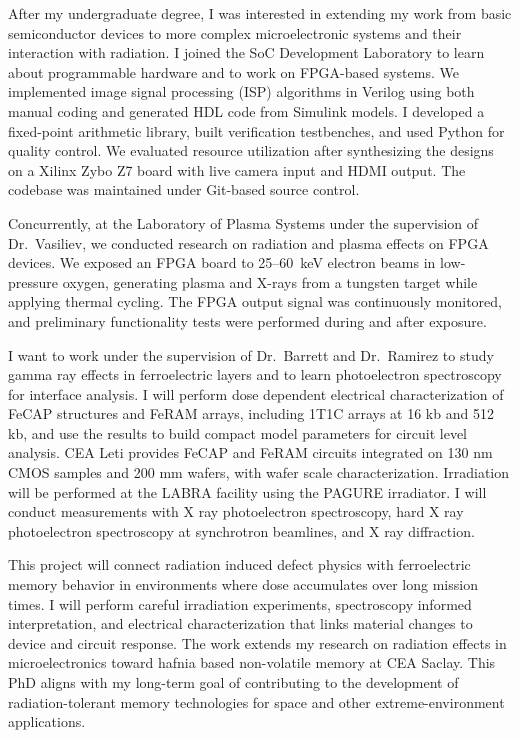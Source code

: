 \documentclass[a4paper,12pt]{article}
\begin{document}
After my undergraduate degree, I was interested in extending my work from basic semiconductor devices to more complex microelectronic systems and their interaction with radiation. I joined the SoC Development Laboratory to learn about programmable hardware and to work on FPGA-based systems. We implemented image signal processing (ISP) algorithms in Verilog using both manual coding and generated HDL code from Simulink models. I developed a fixed-point arithmetic library, built verification testbenches, and used Python for quality control. We evaluated resource utilization after synthesizing the designs on a Xilinx Zybo Z7 board with live camera input and HDMI output. The codebase was maintained under Git-based source control. 

Concurrently, at the Laboratory of Plasma Systems under the supervision of Dr.\ Vasiliev, we conducted research on radiation and plasma effects on FPGA devices. We exposed an FPGA board to 25--60~keV electron beams in low-pressure oxygen, generating plasma and X-rays from a tungsten target while applying thermal cycling. The FPGA output signal was continuously monitored, and preliminary functionality tests were performed during and after exposure.

I want to work under the supervision of Dr.\ Barrett and Dr.\ Ramirez to study gamma ray effects in  ferroelectric layers and to learn photoelectron spectroscopy for interface analysis. I will perform dose dependent electrical characterization of FeCAP structures and FeRAM arrays, including 1T1C arrays at 16 kb and 512 kb, and use the results to build compact model parameters for circuit level analysis. CEA Leti provides FeCAP and FeRAM circuits integrated on 130 nm CMOS samples and 200 mm wafers, with wafer scale characterization. Irradiation will be performed at the LABRA facility using the PAGURE irradiator. I will conduct measurements with X ray photoelectron spectroscopy, hard X ray photoelectron spectroscopy at synchrotron beamlines, and X ray diffraction.

This project will connect radiation induced defect physics with ferroelectric memory behavior in environments where dose accumulates over long mission times. I will perform careful irradiation experiments, spectroscopy informed interpretation, and electrical characterization that links material changes to device and circuit response. The work extends my research on radiation effects in microelectronics toward hafnia based non-volatile memory at CEA Saclay. This PhD aligns with my long-term goal of contributing to the development of radiation-tolerant memory technologies for space and other extreme-environment
applications.
\end{document}
